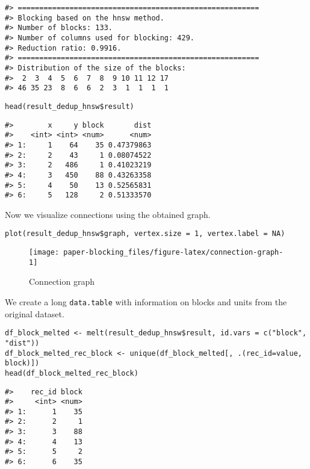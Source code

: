 \begin{verbatim}
#> ========================================================
#> Blocking based on the hnsw method.
#> Number of blocks: 133.
#> Number of columns used for blocking: 429.
#> Reduction ratio: 0.9916.
#> ========================================================
#> Distribution of the size of the blocks:
#>  2  3  4  5  6  7  8  9 10 11 12 17 
#> 46 35 23  8  6  6  2  3  1  1  1  1
\end{verbatim}

\begin{verbatim}
head(result_dedup_hnsw$result)
\end{verbatim}

\begin{verbatim}
#>        x     y block       dist
#>    <int> <int> <num>      <num>
#> 1:     1    64    35 0.47379863
#> 2:     2    43     1 0.08074522
#> 3:     2   486     1 0.41023219
#> 4:     3   450    88 0.43263358
#> 5:     4    50    13 0.52565831
#> 6:     5   128     2 0.51333570
\end{verbatim}

Now we visualize connections using the obtained graph.

\begin{verbatim}
plot(result_dedup_hnsw$graph, vertex.size = 1, vertex.label = NA)
\end{verbatim}

\begin{figure}[H]

{\centering \texttt{[image: paper-blocking\_files/figure-latex/connection-graph-1]} 

}

\caption{Connection graph}\label{fig:connection-graph}
\end{figure}

We create a long \texttt{data.table} with information on blocks and units from
the original dataset.

\begin{verbatim}
df_block_melted <- melt(result_dedup_hnsw$result, id.vars = c("block", "dist"))
df_block_melted_rec_block <- unique(df_block_melted[, .(rec_id=value, block)])
head(df_block_melted_rec_block)
\end{verbatim}

\begin{verbatim}
#>    rec_id block
#>     <int> <num>
#> 1:      1    35
#> 2:      2     1
#> 3:      3    88
#> 4:      4    13
#> 5:      5     2
#> 6:      6    35
\end{verbatim}

